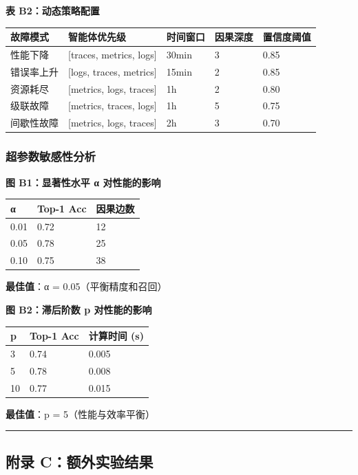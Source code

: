 \textbf{表 B2：动态策略配置}

\begin{longtable}[]{@{}lllll@{}}
\toprule
故障模式 & 智能体优先级 & 时间窗口 & 因果深度 &
置信度阈值\tabularnewline
\midrule
\endhead
性能下降 & {[}traces, metrics, logs{]} & 30min & 3 & 0.85\tabularnewline
错误率上升 & {[}logs, traces, metrics{]} & 15min & 2 &
0.85\tabularnewline
资源耗尽 & {[}metrics, logs, traces{]} & 1h & 2 & 0.80\tabularnewline
级联故障 & {[}metrics, traces, logs{]} & 1h & 5 & 0.75\tabularnewline
间歇性故障 & {[}metrics, logs, traces{]} & 2h & 3 & 0.70\tabularnewline
\bottomrule
\end{longtable}

\hypertarget{ux8d85ux53c2ux6570ux654fux611fux6027ux5206ux6790}{%
\subsubsection{超参数敏感性分析}\label{ux8d85ux53c2ux6570ux654fux611fux6027ux5206ux6790}}

\textbf{图 B1：显著性水平 α 对性能的影响}

\begin{longtable}[]{@{}lll@{}}
\toprule
α & Top-1 Acc & 因果边数\tabularnewline
\midrule
\endhead
0.01 & 0.72 & 12\tabularnewline
0.05 & 0.78 & 25\tabularnewline
0.10 & 0.75 & 38\tabularnewline
\bottomrule
\end{longtable}

\textbf{最佳值}：α = 0.05（平衡精度和召回）

\textbf{图 B2：滞后阶数 p 对性能的影响}

\begin{longtable}[]{@{}lll@{}}
\toprule
p & Top-1 Acc & 计算时间 (s)\tabularnewline
\midrule
\endhead
3 & 0.74 & 0.005\tabularnewline
5 & 0.78 & 0.008\tabularnewline
10 & 0.77 & 0.015\tabularnewline
\bottomrule
\end{longtable}

\textbf{最佳值}：p = 5（性能与效率平衡）

\begin{center}\rule{0.5\linewidth}{0.5pt}\end{center}

\hypertarget{ux9644ux5f55-cux989dux5916ux5b9eux9a8cux7ed3ux679c}{%
\subsection{附录
C：额外实验结果}\label{ux9644ux5f55-cux989dux5916ux5b9eux9a8cux7ed3ux679c}}

